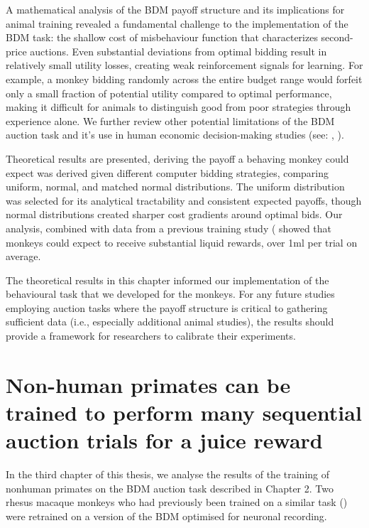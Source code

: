 A mathematical analysis of the BDM payoff structure and its implications for animal training revealed a fundamental challenge to the implementation of the BDM task: the shallow cost of misbehaviour function that characterizes second-price auctions. Even substantial deviations from optimal bidding result in relatively small utility losses, creating weak reinforcement signals for learning. For example, a monkey bidding randomly across the entire budget range would forfeit only a small fraction of potential utility compared to optimal performance, making it difficult for animals to distinguish good from poor strategies through experience alone. We further review other potential limitations of the BDM auction task and it's use in human economic decision-making studies (see: \cite{casonMisconceptionsGameForm2014}, \cite{hamukwalaDesignFactorsInfluencing2019}).

Theoretical results are presented, deriving the payoff a behaving monkey could expect was derived given different computer bidding strategies, comparing uniform, normal, and matched normal distributions. The uniform distribution was selected for its analytical tractability and consistent expected payoffs, though normal distributions created sharper cost gradients around optimal bids. Our analysis, combined with data from a previous training study (\cite{almohammadRewardValueRevealed2022} showed that monkeys could expect to receive substantial liquid rewards, over 1ml per trial on average.

The theoretical results in this chapter informed our implementation of the behavioural task that we developed for the monkeys. For any future studies employing auction tasks where the payoff structure is critical to gathering sufficient data (i.e., especially additional animal studies), the results should provide a framework for researchers to calibrate their experiments.

\clearpage
\section{Non-human primates can be trained to perform many sequential auction trials for a juice reward}

In the third chapter of this thesis, we analyse the results of the training of nonhuman primates on the BDM auction task described in Chapter 2. Two rhesus macaque monkeys who had previously been trained on a similar task (\cite{almohammadRewardValueRevealed2022}) were retrained on a version of the BDM optimised for neuronal recording.

